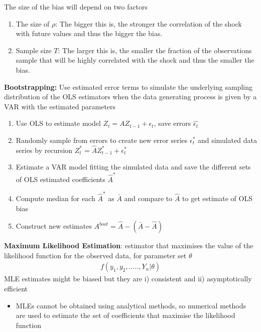\documentclass{beamer}
\begin{document}
\begin{frame}
  The size of the bias will depend on two factors
  \begin{enumerate}
  \item The size of $\rho$: The bigger this is, the stronger the correlation of the shock with future values and thus the bigger the bias.
  \item Sample size $T$: The larger this is, the smaller the fraction of the observations sample that will be highly correlated with the shock and thus the smaller the bias.
\end{enumerate}
\end{frame}

\begin{frame}
  \textbf{Bootstrapping:} Use estimated error terms to simulate the underlying sampling distribution of the OLS estimators when the data generating process is given by a VAR with the estimated parameters
\begin{enumerate}
  \item Use OLS to estimate model $Z_t= AZ_{t-1} + \epsilon_t$, save errors $\hat{\epsilon_t} $
  \item Randomly sample from errors to create new error series $\epsilon^*_t$ and simulated data series by recursion $Z^*_t= \hat{A}Z^*_{t-1} + \epsilon^*_t$
  \item Estimate a VAR model fitting the simulated data and save the different sets of OLS estimated coefficients $\hat{A}^*$
  \item Compute median for each $\hat{A}^*$ as $\bar{A}$ and compare to $\hat{A}$ to get estimate of OLS bias
  \item Construct new estimates $A^{boot} = \hat{A}-(\bar{A}-\hat{A})$
\end{enumerate}
\end{frame}


\begin{frame}
  \textbf{Maximum Likelihood Estimation}: estimator that maximises the value of the likelihood function for the observed data, for parameter set $\theta$
  \begin{align}
    f(y_1,y_2,.....,Y_n| \theta)
  \end{align}
  \medskip
  MLE estimates might be biased but they are i) consistent and ii) asymptotically efficient
  \begin{itemize}
    \item MLEs cannot be obtained using analytical methods, so numerical methods are used to estimate the set of coefficients that maximise the likelihood function
  \end{itemize}
\end{frame}
\end{document}
